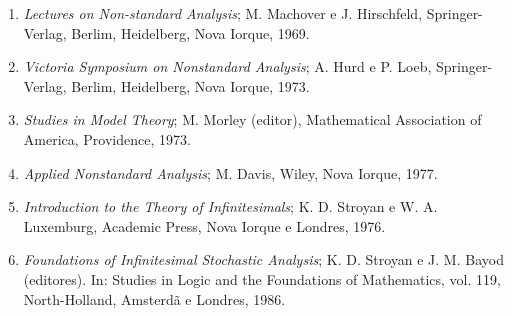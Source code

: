 
\begin{enumerate}[]
\item \emph{Lectures on Non-standard Analysis}; M. Machover e J. Hirschfeld, Springer-Verlag, Berlim, Heidelberg, Nova Iorque, 1969.
\item \emph{Victoria Symposium on Nonstandard Analysis}; A. Hurd e P. Loeb, Springer-Verlag, Berlim, Heidelberg, Nova Iorque, 1973.
\item \emph{Studies in Model Theory}; M. Morley (editor), Mathematical Association of America, Providence, 1973.
\item \emph{Applied Nonstandard Analysis}; M. Davis, Wiley, Nova Iorque, 1977.
\item \emph{Introduction to the Theory of Infinitesimals}; K. D. Stroyan e W. A. Luxemburg, Academic Press, Nova Iorque e Londres, 1976.
\item \emph{Foundations of Infinitesimal Stochastic Analysis}; K. D. Stroyan e J. M. Bayod (editores). In: Studies in Logic and the Foundations of Mathematics, vol. 119, North-Holland, Amsterdã e Londres, 1986.
\end{enumerate}

